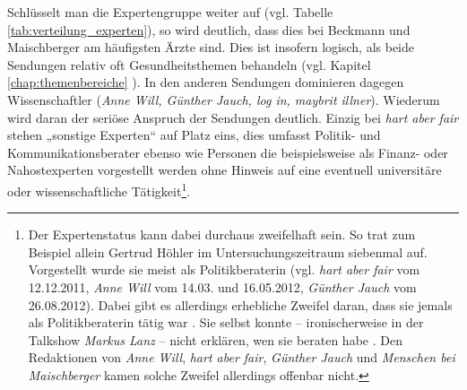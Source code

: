 Schlüsselt man die Expertengruppe weiter auf (vgl. Tabelle \vref{tab:verteilung_experten}), so wird deutlich, dass dies bei Beckmann  und Maischberger am häufigsten Ärzte sind. Dies ist insofern logisch, als beide Sendungen relativ oft Gesundheitsthemen behandeln (vgl. Kapitel \vref{chap:themenbereiche} ). In den anderen Sendungen dominieren dagegen Wissenschaftler (\textit{Anne Will, Günther Jauch, log in, maybrit illner}). Wiederum wird daran der seriöse Anspruch der Sendungen deutlich. Einzig bei \textit{hart aber fair} stehen „sonstige Experten“ auf Platz eins, dies umfasst Politik- und Kommunikationsberater ebenso wie Personen die beispielsweise als Finanz- oder Nahostexperten vorgestellt werden ohne Hinweis auf eine eventuell universitäre oder wissenschaftliche Tätigkeit\footnote{Der Expertenstatus kann dabei durchaus zweifelhaft sein. So trat zum Beispiel allein Gertrud Höhler im Untersuchungszeitraum siebenmal auf. Vorgestellt wurde sie  meist als Politikberaterin (vgl. \textit{hart aber fair} vom 12.12.2011, \textit{Anne Will} vom 14.03. und 16.05.2012, \textit{Günther Jauch} vom 26.08.2012). Dabei gibt es allerdings erhebliche Zweifel daran, dass sie jemals als Politikberaterin tätig war \parencite{langguthLegendeKanzlerberaterin2012}. Sie selbst konnte – ironischerweise in der Talkshow \textit{Markus Lanz} – nicht erklären, wen sie beraten habe \parencite{sasseGertrudHoehlerDemontiert2012}. Den Redaktionen von \textit{Anne Will}, \textit{hart aber fair}, \textit{Günther Jauch} und \textit{Menschen bei Maischberger} kamen solche Zweifel allerdings offenbar nicht.}.

